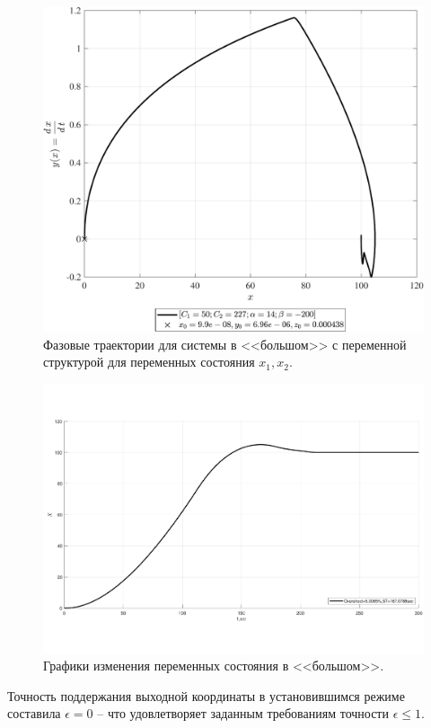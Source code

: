 \begin{figure}[!h]\centering
\includegraphics[width=0.7\linewidth]{images/final_VSS_ft_VSS_final_2_bol}
\caption{ Фазовые траектории для системы в <<большом>> с переменной структурой для переменных состояния $x_1,x_2$.}\label{fig:final_VSS_ft_VSS_final_2_bol}
\end{figure}
\begin{figure}[!h]\centering
\includegraphics[width=1.0\linewidth]{images/final_VSS_sv_VSS_final_bol}
\caption{ Графики изменения переменных состояния в <<большом>>.}\label{fig:final_VSS_sv_VSS_final_bol}
\end{figure}

Точность поддержания выходной координаты в установившимся режиме составила $\epsilon=0$ – что удовлетворяет заданным требованиям точности $\epsilon\le1$.
